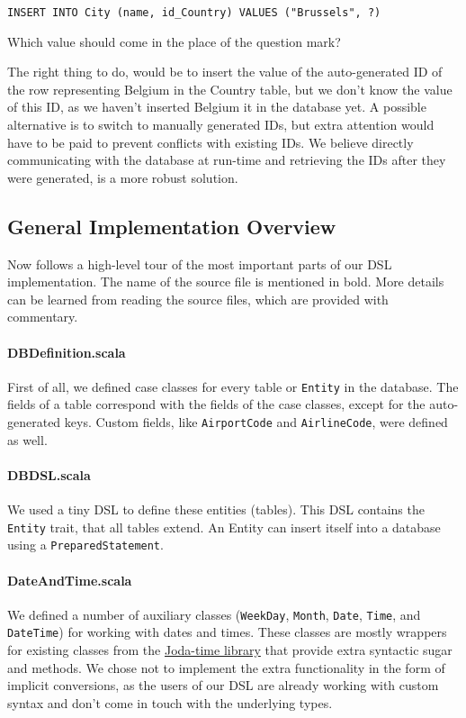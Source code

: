 \documentclass[a4paper]{article}
\newcommand{\cc}[1]{\texttt{#1}}
\begin{document}
\cc{INSERT INTO City (name, id\_Country) VALUES ("Brussels", ?)}

Which value should come in the place of the question mark?

The right thing to do, would be to insert the value of the auto-generated ID of the row representing Belgium in the Country table, but we don't know the value of this ID, as we haven't inserted Belgium it in the database yet.
A possible alternative is to switch to manually generated IDs, but extra attention would have to be paid to prevent conflicts with existing IDs.
We believe directly communicating with the database at run-time and retrieving the IDs after they were generated, is a more robust solution.

\subsection{General Implementation Overview}
\label{sec:general-implementation-overview}

Now follows a high-level tour of the most important parts of our DSL implementation.
The name of the source file is mentioned in bold.
More details can be learned from reading the source files, which are provided with commentary.

\paragraph{DBDefinition.scala}
First of all, we defined case classes for every table or \cc{Entity} in the database.
The fields of a table correspond with the fields of the case classes, except for the auto-generated keys.
Custom fields, like \cc{Airport\-Code} and \cc{Air\-line\-Code}, were defined as well.

\paragraph{DBDSL.scala}
We used a tiny DSL to define these entities (tables).
This DSL contains the \cc{Entity} trait, that all tables extend.
An Entity can insert itself into a database using a \cc{PreparedStatement}.

\paragraph{DateAndTime.scala}
We defined a number of auxiliary classes (\cc{WeekDay}, \cc{Month}, \cc{Date}, \cc{Time}, and \cc{DateTime}) for working with dates and times.
These classes are mostly wrappers for existing classes from the \href{http://joda-time.sourceforge.net/}{Joda-time library} that provide extra syntactic sugar and methods.
We chose not to implement the extra functionality in the form of implicit conversions, as the users of our DSL are already working with custom syntax and don't come in touch with the underlying types.
\end{document}
